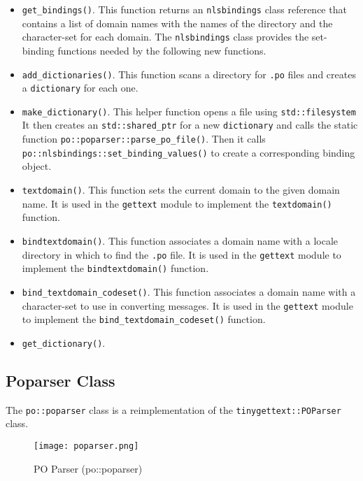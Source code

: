    \begin{itemize}
      \item \texttt{get\_bindings()}. This function returns an
         \texttt{nlsbindings} class reference that contains a list of domain
         names with the names of the directory and the character-set
         for each domain.
         The \texttt{nlsbindings} class provides the set-binding functions
         needed by the following new functions.
      \item \texttt{add\_dictionaries()}.
         This function scans a directory for \texttt{.po} files
         and creates a \texttt{dictionary} for each one.
      \item \texttt{make\_dictionary()}.
         This helper function opens a file using \texttt{std::filesystem}
         It then creates an \texttt{std::shared\_ptr} for a new
         \texttt{dictionary} and calls the static function
         \texttt{po::poparser::parse\_po\_file()}.
         Then it calls \texttt{po::nlsbindings::set\_binding\_values()}
         to create a corresponding binding object.
      \item \texttt{textdomain()}.
         This function sets the current domain to the given domain name.
         It is used in the \texttt{gettext} module to
         implement the \texttt{textdomain()} function.
      \item \texttt{bindtextdomain()}.
         This function associates a domain name with a locale directory
         in which to find the \texttt{.po} file.
         It is used in the \texttt{gettext} module to
         implement the \texttt{bindtextdomain()} function.
      \item \texttt{bind\_textdomain\_codeset()}.
         This function associates a domain name with a character-set to
         use in converting messages.
         It is used in the \texttt{gettext} module to
         implement the \texttt{bind\_textdomain\_codeset()} function.
      \item \texttt{get\_dictionary()}.
   \end{itemize}

\subsection{Poparser Class}
\label{subsec:potext_poparser_class}

   The \texttt{po::poparser} class is a reimplementation of the
   \texttt{tinygettext::POParser} class.

\begin{figure}[H]
   \centering 
   \texttt{[image: poparser.png]}
   \caption{PO Parser (po::poparser)}
   \label{fig:potext_poparser}
\end{figure}

